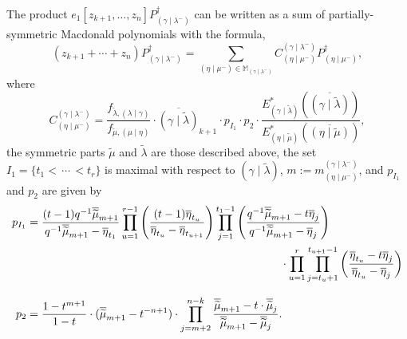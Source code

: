 \documentclass[ALCO]{cedram}
\newcommand{\Estar}[1]{E^*_{#1}}
\newcommand{\PB}[1]{P_{#1}^\dagger}
\newcommand{\MM}{\mathbb{M}_{\gammalambdamin}}
\newcommand{\nudom}{{( \lambda \mid \gamma )}}
\newcommand{\lambdagamma}{{\nudom}}
\newcommand{\gammalambdamin}{{(\gamma \mid \lambda^-)}}
\newcommand{\etamu}{{(\eta \mid \mu^-)}}
\newcommand{\mueta}{{(\mu \mid \eta)}}
\newcommand{\mutilde}{{\widetilde{\mu}}}
\newcommand{\lambdatilde}{{\widetilde{\lambda}}}
\newcommand{\gammalambdatilde}{{(\gamma \mid \lambdatilde)}}
\newcommand{\etamutilde}{{(\eta \mid \widetilde{\mu})}}
\newcommand{\mIone}{m_{\etamu}^{\gammalambdamin}}
\newcommand{\fmutilde}{f_{\mutilde, \mueta}}
\begin{document}
\begin{thm}\label{Pieriformula}
The product $e_1[z_{k+1},\dotsc, z_n] \PB{\gammalambdamin}$ can be written as a sum of partially-symmetric Macdonald polynomials with the formula,
\[ (z_{k+1} + \dotsm + z_n)\PB{\gammalambdamin} = \sum_{\etamu \in \MM} C^{\gammalambdamin}_{\etamu} \PB{\etamu},\]
where
\[C^{\gammalambdamin}_{\etamu} = \frac{f_{\lambdatilde,\lambdagamma}}{\fmutilde} \cdot \overline{\gammalambdatilde}_{k+1} \cdot p_{I_1} \cdot p_{2}\cdot \frac{\Estar{\gammalambdatilde}\left(\overline{\gammalambdatilde} \right)}{\Estar{\etamutilde} \left( \overline{\etamutilde}\right)}, \]
 the symmetric parts $\mutilde$ and $\lambdatilde$ are those described above, the set $I_1=\{t_1 < \, \dotsm \, < t_r\}$ is maximal with respect to $\gammalambdatilde$, $m := \mIone$, and $p_{I_1}$ and $p_{2}$ are given by
\begin{align*}
    p_{I_1}     &= \frac{(t-1)q^{-1} \overline{\mutilde}_{m+1}}{q^{-1} \overline{\mutilde}_{m+1}-\overline{\eta}_{t_1}} \prod_{u=1}^{r-1} \left(\frac{(t-1) \overline{\eta}_{t_u}}{ \overline{\eta}_{t_u}-\overline{\eta}_{t_{u+1}}}\right)  \prod_{j=1}^{t_1-1} \left( \frac{q^{-1} \overline{\mutilde}_{m+1} - t \overline{\eta}_j}{q^{-1} \overline{\mutilde}_{m+1} -  \overline{\eta}_j} \right) \\ & \hspace*{8cm} \cdot \prod_{u=1}^{r} \prod_{j=t_u+1}^{t_{u+1}-1}  \left(\frac{\overline{\eta}_{t_u} - t \overline{\eta}_j}{ \overline{\eta}_{t_u} -  \overline{\eta}_j} \right)\\[3mm]
    p_{2} &= \frac{1-t^{m+1}}{1-t}\cdot (\overline{\mutilde}_{m+1} - t^{-n+1}) \cdot \prod_{j=m+2}^{n-k} \frac{\overline{\mutilde}_{m+1} - t \cdot \overline{\mutilde}_j}{\overline{\mutilde}_{m+1} - \overline{\mutilde}_j}.
\end{align*}
\end{thm}
\end{document}
